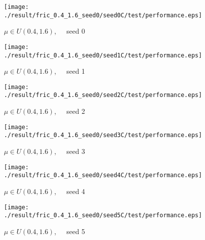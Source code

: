 \begin{figure}[p]
 \begin{minipage}{0.49\hsize}
  \begin{center}
 \texttt{[image: ./result/fric\_0.4\_1.6\_seed0/seed0C/test/performance.eps]}
  \caption{$\mu\in U(0.4,1.6)$,~~~seed 0
  }
  \end{center}
 \end{minipage}
 \begin{minipage}{0.49\hsize}
   \begin{center}
 \texttt{[image: ./result/fric\_0.4\_1.6\_seed0/seed1C/test/performance.eps]}
  \caption{$\mu\in U(0.4,1.6)$,~~~seed 1
  }
  \end{center}
 \end{minipage}
\end{figure}

\begin{figure}[p]
 \begin{minipage}{0.49\hsize}
  \begin{center}
 \texttt{[image: ./result/fric\_0.4\_1.6\_seed0/seed2C/test/performance.eps]}
  \caption{$\mu\in U(0.4,1.6)$,~~~seed 2
  }
  \end{center}
 \end{minipage}
 \begin{minipage}{0.49\hsize}
   \begin{center}
 \texttt{[image: ./result/fric\_0.4\_1.6\_seed0/seed3C/test/performance.eps]}
  \caption{$\mu\in U(0.4,1.6)$,~~~seed 3
  }
  \end{center}
 \end{minipage}
\end{figure}

\begin{figure}[p]
 \begin{minipage}{0.49\hsize}
  \begin{center}
 \texttt{[image: ./result/fric\_0.4\_1.6\_seed0/seed4C/test/performance.eps]}
  \caption{$\mu\in U(0.4,1.6)$,~~~seed 4
  }
  \end{center}
 \end{minipage}
 \begin{minipage}{0.49\hsize}
   \begin{center}
 \texttt{[image: ./result/fric\_0.4\_1.6\_seed0/seed5C/test/performance.eps]}
  \caption{$\mu\in U(0.4,1.6)$,~~~seed 5
  }
  \end{center}
 \end{minipage}
\end{figure}
